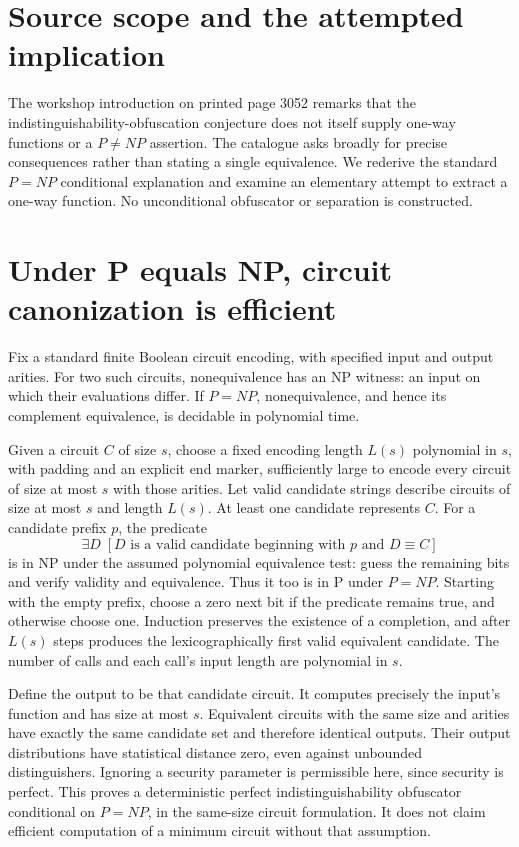 \documentclass[11pt]{article}
\begin{document}
\section{Source scope and the attempted implication}
The workshop introduction on printed page 3052 remarks that the
indistinguishability-obfuscation conjecture does not itself supply one-way
functions or a $P\ne NP$ assertion. The catalogue asks broadly for precise
consequences rather than stating a single equivalence. We rederive the
standard $P=NP$ conditional explanation and examine an elementary attempt
to extract a one-way function. No unconditional obfuscator or separation
is constructed.

\section{Under P equals NP, circuit canonization is efficient}
Fix a standard finite Boolean circuit encoding, with specified input and
output arities. For two such circuits, nonequivalence has an NP witness:
an input on which their evaluations differ. If $P=NP$, nonequivalence,
and hence its complement equivalence, is decidable in polynomial time.

Given a circuit $C$ of size $s$, choose a fixed encoding length $L(s)$
polynomial in $s$, with padding and an explicit end marker, sufficiently
large to encode every circuit of size at most $s$ with those arities.
Let valid candidate strings describe circuits of size at most $s$ and
length $L(s)$. At least one candidate represents $C$.
For a candidate prefix $p$, the predicate
\[
\exists D\;[D\text{ is a valid candidate beginning with }p
                  \text{ and }D\equiv C]
\]
is in NP under the assumed polynomial equivalence test: guess the
remaining bits and verify validity and equivalence. Thus it too is in P
under $P=NP$. Starting with the empty prefix, choose a zero next bit if
the predicate remains true, and otherwise choose one. Induction preserves
the existence of a completion, and after $L(s)$ steps produces the
lexicographically first valid equivalent candidate. The number of calls
and each call's input length are polynomial in $s$.

Define the output to be that candidate circuit. It computes precisely the
input's function and has size at most $s$. Equivalent circuits with the
same size and arities have exactly the same candidate set and therefore
identical outputs. Their output distributions have statistical distance
zero, even against unbounded distinguishers. Ignoring a security parameter
is permissible here, since security is perfect. This proves a deterministic
perfect indistinguishability obfuscator conditional on $P=NP$, in the
same-size circuit formulation. It does not claim efficient computation
of a minimum circuit without that assumption.
\end{document}
